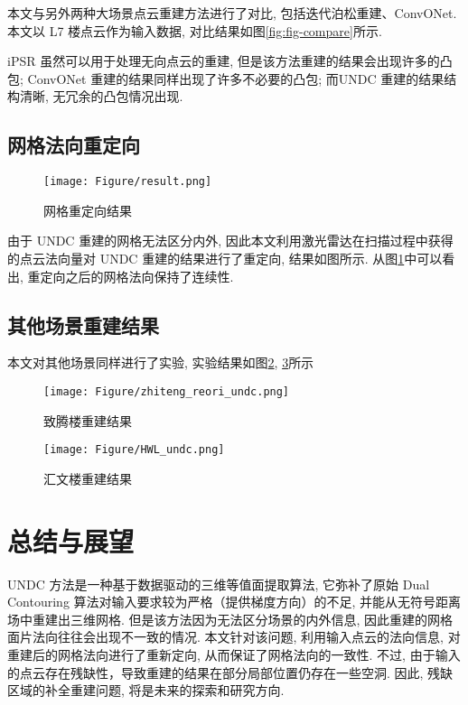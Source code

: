 本文与另外两种大场景点云重建方法进行了对比, 包括迭代泊松重建\cite{hou2022iterative}、ConvONet\cite{tang2021sa}. 本文以 L7 楼点云作为输入数据, 对比结果如图\ref{fig:fig-compare}所示. 

iPSR 虽然可以用于处理无向点云的重建, 但是该方法重建的结果会出现许多的凸包; ConvONet 重建的结果同样出现了许多不必要的凸包; 而UNDC 重建的结果结构清晰, 无冗余的凸包情况出现. 

\subsection{网格法向重定向} \label{reorientation}
\begin{figure}[H]
	\center
	\texttt{[image: Figure/result.png]}
	\centering
	\caption{网格重定向结果}\label{fig:fig-result}
\end{figure}
由于 UNDC 重建的网格无法区分内外, 因此本文利用激光雷达在扫描过程中获得的点云法向量对 UNDC 重建的结果进行了重定向, 结果如图所示. 从图\ref{fig:fig-result}中可以看出, 重定向之后的网格法向保持了连续性. 

\subsection{其他场景重建结果}

本文对其他场景同样进行了实验, 实验结果如图\ref{fig:fig-zhiteng}, \ref{fig:fig-hwl}所示
\begin{figure}[H]
	\center
	\texttt{[image: Figure/zhiteng\_reori\_undc.png]}
	\centering
	\caption{致腾楼重建结果}\label{fig:fig-zhiteng}
\end{figure}

\begin{figure}[H]
	\center
	\texttt{[image: Figure/HWL\_undc.png]}
	\centering
	\caption{汇文楼重建结果}\label{fig:fig-hwl}
\end{figure}


\section{总结与展望}
UNDC 方法是一种基于数据驱动的三维等值面提取算法, 它弥补了原始 Dual Contouring 算法对输入要求较为严格（提供梯度方向）的不足, 并能从无符号距离场中重建出三维网格. 
但是该方法因为无法区分场景的内外信息, 因此重建的网格面片法向往往会出现不一致的情况. 
本文针对该问题, 利用输入点云的法向信息, 对重建后的网格法向进行了重新定向, 从而保证了网格法向的一致性. 不过, 由于输入的点云存在残缺性，导致重建的结果在部分局部位置仍存在一些空洞. 因此, 残缺区域的补全重建问题, 将是未来的探索和研究方向.

\printbibliography%
